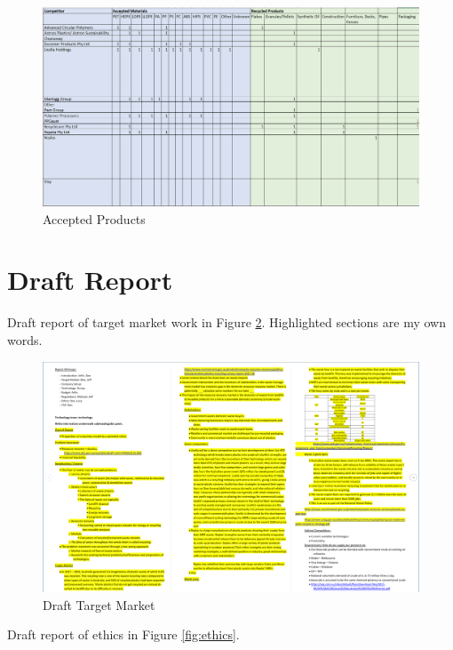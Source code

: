 \documentclass[11pt, a4, nocenter, margin=150mm]{article}
\begin{document}
\begin{appendices}
	\begin{figure}[h!]
		\centering
		\includegraphics[width=\textwidth]{week7/accepted_products.png}
		\caption{Accepted Products}
		\label{fig:accepted_products}
	\end{figure}

\pagebreak

\section{Draft Report}
\label{app:draft}

	Draft report of target market work in Figure \ref{fig:draft}. Highlighted sections are my own words.

	\begin{figure}[h!]
		\centering
		\includegraphics[width=\textwidth]{week8/draft_target_market.png}
		\caption{Draft Target Market}
		\label{fig:draft}
	\end{figure}

	Draft report of ethics in Figure \ref{fig:ethics}.


\end{appendices}
\end{document}
